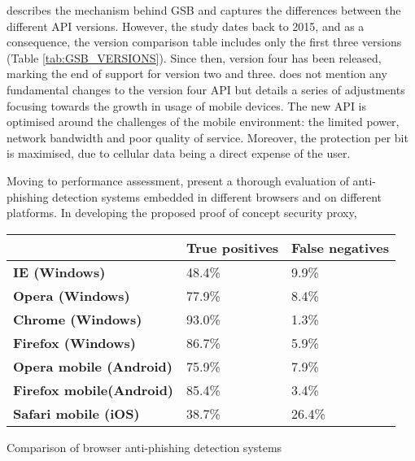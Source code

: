 \cite{Priyam_Sandhu} describes the mechanism behind GSB and captures the differences between the different API versions. However, the study dates back to 2015, and as a consequence, the version comparison table includes only the first three versions (Table \ref{tab:GSB_VERSIONS}). Since then, version four has been released, marking the end of support for version two and three.
\cite{Google} does not mention any fundamental changes to the version four API but details a series of adjustments focusing towards the growth in usage of mobile devices. The new API is optimised around the challenges of the mobile environment: the limited power, network bandwidth and poor quality of service. Moreover, the protection per bit is maximised, due to cellular data being a direct expense of the user.

Moving to performance assessment, \cite{Nikos_Virvilis} present a thorough evaluation of anti-phishing detection systems embedded in different browsers and on different platforms. In developing the proposed proof of concept security proxy, \cite{Nikos_Virvilis}

\begin{center}
	\small
	\begin{tabularx}{\textwidth}{  X  X  X  }\toprule
		                                 & \textbf{True positives} & \textbf{False negatives} \\ \midrule
		\textbf{IE (Windows)}            & 48.4\%                  & 9.9\%                    \\

		\textbf{Opera (Windows)}         & 77.9\%                  & 8.4\%                    \\

		\textbf{Chrome (Windows)}        & 93.0\%                  & 1.3\%                    \\

		\textbf{Firefox (Windows)}       & 86.7\%                  & 5.9\%                    \\

		\textbf{Opera mobile (Android)}  & 75.9\%                  & 7.9\%                    \\

		\textbf{Firefox mobile(Android)} & 85.4\%                  & 3.4\%                    \\

		\textbf{Safari mobile (iOS)}     & 38.7\%                  & 26.4\%                    \\\bottomrule
	\end{tabularx}
	\captionsetup{type=table}\caption{\label{tab:APDS_COMPARISON}Comparison of browser anti-phishing detection systems \citep{Nikos_Virvilis}}

\end{center}

